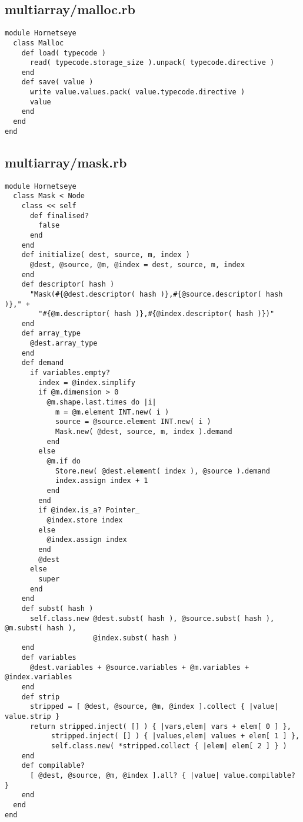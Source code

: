 \subsection{multiarray/malloc.rb}\label{cha:multiarray-malloc-rb}
\begin{lstlisting}
module Hornetseye
  class Malloc
    def load( typecode )
      read( typecode.storage_size ).unpack( typecode.directive )
    end
    def save( value )
      write value.values.pack( value.typecode.directive )
      value
    end
  end
end
\end{lstlisting}
\subsection{multiarray/mask.rb}\label{cha:multiarray-mask-rb}
\begin{lstlisting}
module Hornetseye
  class Mask < Node
    class << self
      def finalised?
        false
      end
    end
    def initialize( dest, source, m, index )
      @dest, @source, @m, @index = dest, source, m, index
    end
    def descriptor( hash )
      "Mask(#{@dest.descriptor( hash )},#{@source.descriptor( hash )}," +
        "#{@m.descriptor( hash )},#{@index.descriptor( hash )})"
    end
    def array_type
      @dest.array_type
    end
    def demand
      if variables.empty?
        index = @index.simplify
        if @m.dimension > 0
          @m.shape.last.times do |i|
            m = @m.element INT.new( i )
            source = @source.element INT.new( i )
            Mask.new( @dest, source, m, index ).demand
          end  
        else
          @m.if do
            Store.new( @dest.element( index ), @source ).demand
            index.assign index + 1
          end
        end
        if @index.is_a? Pointer_
          @index.store index
        else
          @index.assign index
        end
        @dest
      else
        super
      end
    end
    def subst( hash )
      self.class.new @dest.subst( hash ), @source.subst( hash ), @m.subst( hash ),
                     @index.subst( hash )
    end
    def variables
      @dest.variables + @source.variables + @m.variables + @index.variables
    end
    def strip
      stripped = [ @dest, @source, @m, @index ].collect { |value| value.strip }
      return stripped.inject( [] ) { |vars,elem| vars + elem[ 0 ] },
           stripped.inject( [] ) { |values,elem| values + elem[ 1 ] },
           self.class.new( *stripped.collect { |elem| elem[ 2 ] } )
    end
    def compilable?
      [ @dest, @source, @m, @index ].all? { |value| value.compilable? }
    end
  end
end
\end{lstlisting}
